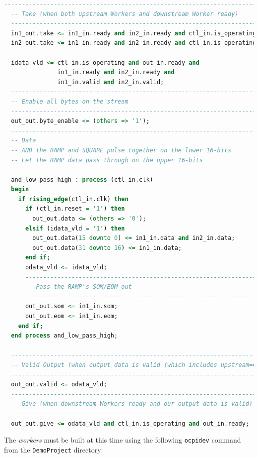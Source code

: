 \begin{lstlisting}[language=vhdl]
  -----------------------------------------------------------------------------
  -- Take (when both upstream Workers and downstream Worker ready)
  -----------------------------------------------------------------------------
  in1_out.take <= in1_in.ready and in2_in.ready and ctl_in.is_operating and out_in.ready;
  in2_out.take <= in1_in.ready and in2_in.ready and ctl_in.is_operating and out_in.ready;

  idata_vld <= ctl_in.is_operating and out_in.ready and
               in1_in.ready and in2_in.ready and
               in1_in.valid and in2_in.valid;
  -----------------------------------------------------------------------------
  -- Enable all bytes on the stream
  -----------------------------------------------------------------------------
  out_out.byte_enable <= (others => '1');
  -----------------------------------------------------------------------------
  -- Data
  -- AND the RAMP and SQUARE pulse together on the lower 16-bits
  -- Let the RAMP data pass through on the upper 16-bits
  -----------------------------------------------------------------------------
  and_low_pass_high : process (ctl_in.clk)
  begin
    if rising_edge(ctl_in.clk) then
      if (ctl_in.reset = '1') then
        out_out.data <= (others => '0');
      elsif (idata_vld = '1') then
        out_out.data(15 downto 0) <= in1_in.data and in2_in.data;
        out_out.data(31 downto 16) <= in1_in.data;
      end if;
      odata_vld <= idata_vld;
      -----------------------------------------------------------------------------
      -- Pass the RAMP's SOM/EOM out
      -----------------------------------------------------------------------------
      out_out.som <= in1_in.som;
      out_out.eom <= in1_in.eom;
    end if;
  end process and_low_pass_high;

  -----------------------------------------------------------------------------
  -- Valid Output (when output data is valid (which includes upstream==ready))
  -----------------------------------------------------------------------------
  out_out.valid <= odata_vld;
  -----------------------------------------------------------------------------
  -- Give (when downstream Workers ready and our output data is valid)
  -----------------------------------------------------------------------------
  out_out.give <= odata_vld and ctl_in.is_operating and out_in.ready;
\end{lstlisting}
The \textit{workers} must be built at this time using the following \verb+ocpidev+ command from the \verb+DemoProject+ directory:\\

